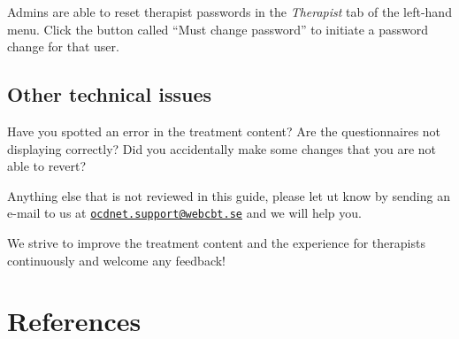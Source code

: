 \documentclass[]{book}
\theoremstyle{definition}
\theoremstyle{definition}
\theoremstyle{definition}
\theoremstyle{remark}
\begin{document}
Admins are able to reset therapist passwords in the \emph{Therapist} tab
of the left-hand menu. Click the button called ``Must change password''
to initiate a password change for that user.

\hypertarget{other-technical-issues}{%
\section{Other technical issues}\label{other-technical-issues}}

Have you spotted an error in the treatment content? Are the
questionnaires not displaying correctly? Did you accidentally make some
changes that you are not able to revert?

Anything else that is not reviewed in this guide, please let ut know by
sending an e-mail to us at
\href{mailto:ocdnet.support@webcbt.se}{\nolinkurl{ocdnet.support@webcbt.se}}
and we will help you.

We strive to improve the treatment content and the experience for
therapists continuously and welcome any feedback!

\hypertarget{references}{%
\chapter{References}\label{references}}


\end{document}
